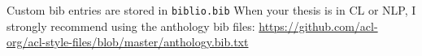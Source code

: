 Custom bib entries are stored in \texttt{biblio.bib}
When your thesis is in CL or NLP, I strongly recommend using the anthology bib files: 
\url{https://github.com/acl-org/acl-style-files/blob/master/anthology.bib.txt}


